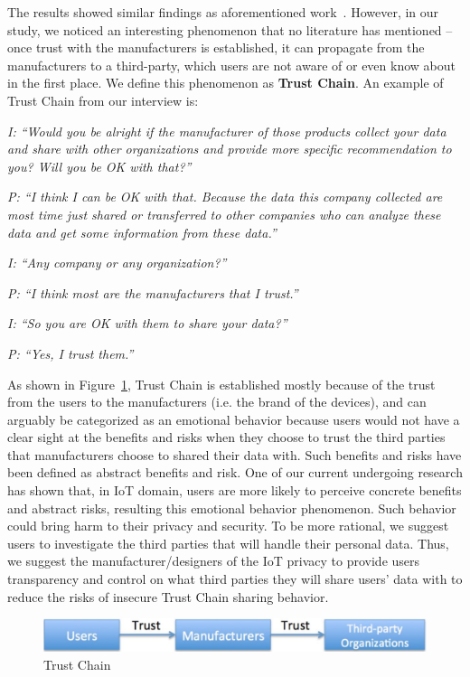 The results showed similar findings as aforementioned work~\cite{gao2014unified, al2016modeling}. However, in our study, we noticed an interesting phenomenon that no literature has mentioned -- once trust with the manufacturers is established, it can propagate from the manufacturers to a third-party, which users are not aware of or even know about in the first place. We define this phenomenon as \textbf{Trust Chain}. An example of Trust Chain from our interview is:

\textit{I: ``Would you be alright if the manufacturer of those products collect your data and share with other organizations and provide more specific recommendation to you? Will you be OK with that?''}

\textit{P: ``I think I can be OK with that. Because the data this company collected are most time just shared or transferred to other companies who can analyze these data and get some information from these data.''}

\textit{I: ``Any company or any organization?''}

\textit{P: ``I think most are the manufacturers that I trust.''}

\textit{I: ``So you are OK with them to share your data?''}

\textit{P: ``Yes, I trust them.''}

As shown in Figure~\ref{fig:trustchain}, Trust Chain is established mostly because of the trust from the users to the manufacturers (i.e. the brand of the devices), and can arguably be categorized as an emotional behavior because users would not have a clear sight at the benefits and risks when they choose to trust the third parties that manufacturers choose to shared their data with. Such benefits and risks have been defined as abstract benefits and risk. One of our current undergoing research has shown that, in IoT domain, users are more likely to perceive concrete benefits and abstract risks, resulting this emotional behavior phenomenon. Such behavior could bring harm to their privacy and security. To be more rational, we suggest users to investigate the third parties that will handle their personal data. Thus, we suggest the manufacturer/designers of the IoT privacy to provide users transparency and control on what third parties they will share users' data with to reduce the risks of insecure Trust Chain sharing behavior.

\begin{figure}
	\centering
	\includegraphics[width=0.75\columnwidth]{figures/trustchain.pdf}
	\caption{Trust Chain}
	\label{fig:trustchain}
\end{figure}

